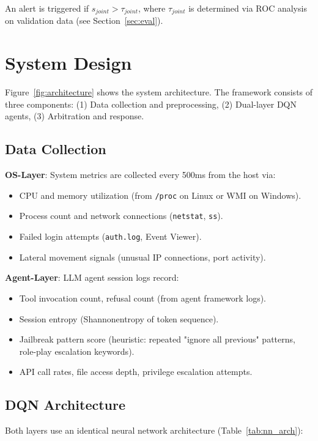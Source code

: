 \documentclass[conference]{IEEEtran}
\begin{document}
An alert is triggered if $s_{joint} > \tau_{joint}$, where $\tau_{joint}$ is determined via ROC analysis on validation data (see Section~\ref{sec:eval}).

\section{System Design}\label{sec:design}

Figure~\ref{fig:architecture} shows the system architecture. The framework consists of three components: (1) Data collection and preprocessing, (2) Dual-layer DQN agents, (3) Arbitration and response.

\subsection{Data Collection}

\textbf{OS-Layer}: System metrics are collected every 500ms from the host via:
\begin{itemize}
\item CPU and memory utilization (from \texttt{/proc} on Linux or WMI on Windows).
\item Process count and network connections (\texttt{netstat}, \texttt{ss}).
\item Failed login attempts (\texttt{auth.log}, Event Viewer).
\item Lateral movement signals (unusual IP connections, port activity).
\end{itemize}

\textbf{Agent-Layer}: LLM agent session logs record:
\begin{itemize}
\item Tool invocation count, refusal count (from agent framework logs).
\item Session entropy (Shannonentropy of token sequence).
\item Jailbreak pattern score (heuristic: repeated "ignore all previous" patterns, role-play escalation keywords).
\item API call rates, file access depth, privilege escalation attempts.
\end{itemize}

\subsection{DQN Architecture}

Both layers use an identical neural network architecture (Table~\ref{tab:nn_arch}):
\end{document}
